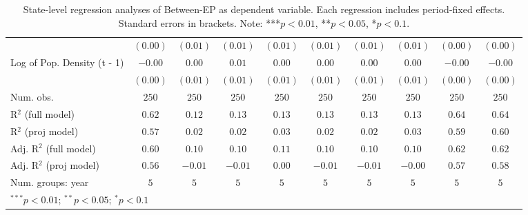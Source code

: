 \begin{table}
\begin{center}
\begin{tabular}{l c c c c c c c c c}
                                  & $(0.00)$     & $(0.01)$ & $(0.01)$ & $(0.01)$ & $(0.01)$ & $(0.01)$ & $(0.01)$ & $(0.00)$     & $(0.00)$     \\
Log of Pop. Density (t - 1)       & $-0.00$      & $0.00$   & $0.01$   & $0.00$   & $0.00$   & $0.00$   & $0.00$   & $-0.00$      & $-0.00$      \\
                                  & $(0.00)$     & $(0.01)$ & $(0.01)$ & $(0.01)$ & $(0.01)$ & $(0.01)$ & $(0.01)$ & $(0.00)$     & $(0.00)$     \\
\hline
Num. obs.                         & $250$        & $250$    & $250$    & $250$    & $250$    & $250$    & $250$    & $250$        & $250$        \\
R$^2$ (full model)                & $0.62$       & $0.12$   & $0.13$   & $0.13$   & $0.13$   & $0.13$   & $0.13$   & $0.64$       & $0.64$       \\
R$^2$ (proj model)                & $0.57$       & $0.02$   & $0.02$   & $0.03$   & $0.02$   & $0.02$   & $0.03$   & $0.59$       & $0.60$       \\
Adj. R$^2$ (full model)           & $0.60$       & $0.10$   & $0.10$   & $0.11$   & $0.10$   & $0.10$   & $0.10$   & $0.62$       & $0.62$       \\
Adj. R$^2$ (proj model)           & $0.56$       & $-0.01$  & $-0.01$  & $0.00$   & $-0.01$  & $-0.01$  & $-0.00$  & $0.57$       & $0.58$       \\
Num. groups: year                 & $5$          & $5$      & $5$      & $5$      & $5$      & $5$      & $5$      & $5$          & $5$          \\
\hline
\multicolumn{10}{l}{\scriptsize{$^{***}p<0.01$; $^{**}p<0.05$; $^{*}p<0.1$}}
\end{tabular}
\caption{State-level regression analyses of Between-EP as dependent variable. Each regression includes period-fixed effects. Standard errors in brackets. Note: ***$p<0.01$, **$p<0.05$, *$p<0.1$.}
\label{tab:between_epi_1}
\end{center}
\end{table}

